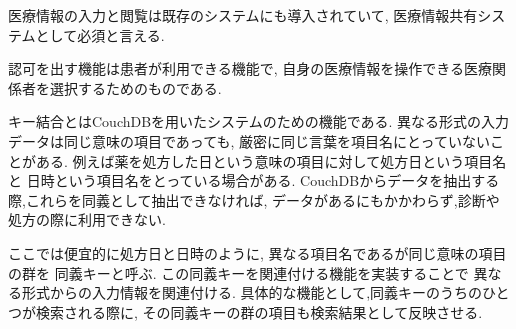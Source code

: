 医療情報の入力と閲覧は既存のシステムにも導入されていて,
医療情報共有システムとして必須と言える.

認可を出す機能は患者が利用できる機能で,
自身の医療情報を操作できる医療関係者を選択するためのものである.

キー結合とはCouchDBを用いたシステムのための機能である.
異なる形式の入力データは同じ意味の項目であっても,
厳密に同じ言葉を項目名にとっていないことがある.
例えば薬を処方した日という意味の項目に対して処方日という項目名と
日時という項目名をとっている場合がある.
CouchDBからデータを抽出する際,これらを同義として抽出できなければ,
データがあるにもかかわらず,診断や処方の際に利用できない.

ここでは便宜的に処方日と日時のように,
異なる項目名であるが同じ意味の項目の群を
同義キーと呼ぶ.
この同義キーを関連付ける機能を実装することで
異なる形式からの入力情報を関連付ける.
具体的な機能として,同義キーのうちのひとつが検索される際に,
その同義キーの群の項目も検索結果として反映させる.
